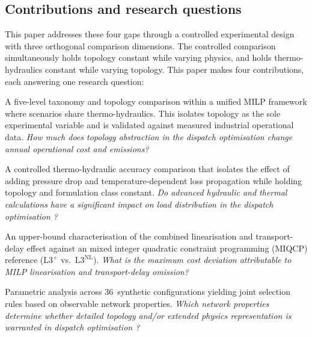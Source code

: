\documentclass[a4paper,fleqn]{cas-dc}
\newcommand{\Lplus}{\mathrm{L3}^{+}}
\newcommand{\Lnl}{\mathrm{L3}^{\mathrm{NL}}}
\begin{document}
\subsection{Contributions and research questions}
\label{sec:contributions}

This paper addresses these four gaps through a controlled
experimental design with three orthogonal comparison dimensions.
The controlled comparison simultaneously holds topology
constant while varying physics, and holds thermo-hydraulics constant while
varying topology. This paper makes four contributions, each answering one
research question:
%
\begin{description}[style=nextline, nosep, leftmargin=1.5em]
  \item[Contribution 1 / RQ1 Topology effect:]
    A five-level taxonomy and topology comparison within a unified MILP
    framework where scenarios share thermo-hydraulics. This
    isolates topology as the sole experimental variable and is
    validated against measured industrial operational data.
    \emph{How much does topology abstraction in the dispatch optimisation  change annual
    operational cost and  emissions?}

  \item[Contribution 2 / RQ2 thermo-hydraulic effect:]
    A controlled thermo-hydraulic accuracy comparison
    that isolates the effect of adding pressure drop and
    temperature-dependent loss propagation while holding topology
    and formulation class constant.
    \emph{Do advanced hydraulic and thermal calculations
    have a significant impact on load distribution in the dispatch optimisation ?}

  \item[Contribution 3 / RQ3 Linearisation error bounds:]
    An upper-bound characterisation of the combined linearisation
    and transport-delay effect against an mixed integer quadratic constraint programming (MIQCP) reference
    ($\Lplus$ vs.\ $\Lnl$).
    \emph{What is the maximum cost deviation attributable to MILP
    linearisation and transport-delay omission?}

  \item[Contribution 4 / RQ4 Generalisability:]
    Parametric analysis across 36~synthetic configurations
    yielding joint selection rules based on observable network
    properties.
    \emph{Which network properties determine whether detailed
    topology and/or extended physics representation is warranted in dispatch optimisation ?}
\end{description}
\end{document}
